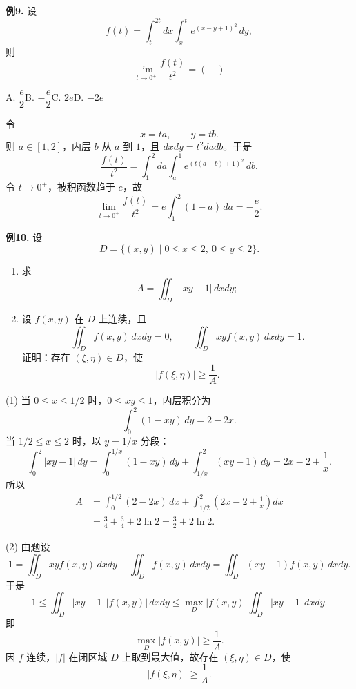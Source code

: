 \begin{problemblock}
\textbf{例9.} 设
\[
f(t)=\int_t^{2t}dx\int_x^t e^{(x-y+1)^2}\,dy,
\]
则
\[
\lim_{t\to0^+}\frac{f(t)}{t^2}=(\quad)
\]

A. \(\dfrac e2\)\qquad B. \(-\dfrac e2\)\qquad C. \(2e\)\qquad D. \(-2e\)
\end{problemblock}
\begin{solutionblock}
令
\[
x=ta,\qquad y=tb.
\]
则 \(a\in[1,2]\)，内层 \(b\) 从 \(a\) 到 \(1\)，且 \(dxdy=t^2dadb\)。于是
\[
\frac{f(t)}{t^2}
=\int_1^2 da\int_a^1 e^{(t(a-b)+1)^2}\,db.
\]
令 \(t\to0^+\)，被积函数趋于 \(e\)，故
\[
\lim_{t\to0^+}\frac{f(t)}{t^2}
=e\int_1^2(1-a)\,da
=-\frac e2.
\]
\end{solutionblock}

\begin{problemblock}
\textbf{例10.} 设
\[
D=\{(x,y)\mid 0\le x\le2,\ 0\le y\le2\}.
\]
\begin{enumerate}[label=(\arabic*), leftmargin=2.2em]
\item 求
\[
A=\iint_D|xy-1|\,dxdy;
\]
\item 设 \(f(x,y)\) 在 \(D\) 上连续，且
\[
\iint_Df(x,y)\,dxdy=0,\qquad
\iint_Dxyf(x,y)\,dxdy=1.
\]
证明：存在 \((\xi,\eta)\in D\)，使
\[
|f(\xi,\eta)|\ge\frac1A.
\]
\end{enumerate}
\end{problemblock}
\begin{solutionblock}
(1) 当 \(0\le x\le1/2\) 时，\(0\le xy\le1\)，内层积分为
\[
\int_0^2(1-xy)\,dy=2-2x.
\]
当 \(1/2\le x\le2\) 时，以 \(y=1/x\) 分段：
\[
\int_0^2|xy-1|\,dy
=\int_0^{1/x}(1-xy)\,dy+\int_{1/x}^{2}(xy-1)\,dy
=2x-2+\frac1x.
\]
所以
\[
\begin{aligned}
A&=\int_0^{1/2}(2-2x)\,dx
+\int_{1/2}^{2}\left(2x-2+\frac1x\right)dx\\
&=\frac34+\frac34+2\ln2
=\frac32+2\ln2.
\end{aligned}
\]

(2) 由题设
\[
1=\iint_Dxyf(x,y)\,dxdy-\iint_Df(x,y)\,dxdy
=\iint_D(xy-1)f(x,y)\,dxdy.
\]
于是
\[
1\le \iint_D|xy-1|\,|f(x,y)|\,dxdy
\le \max_D|f(x,y)|\iint_D|xy-1|\,dxdy.
\]
即
\[
\max_D|f(x,y)|\ge\frac1A.
\]
因 \(f\) 连续，\(|f|\) 在闭区域 \(D\) 上取到最大值，故存在 \((\xi,\eta)\in D\)，使
\[
|f(\xi,\eta)|\ge\frac1A.
\]
\end{solutionblock}

